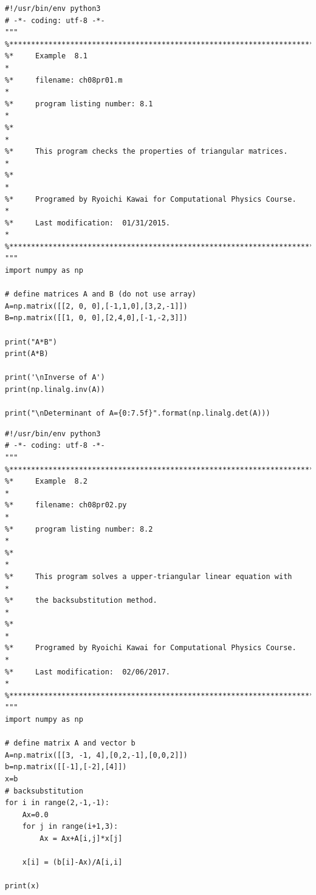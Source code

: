 \bigskip
\noindent
\program
\footnotesize
\begin{verbatim}
#!/usr/bin/env python3
# -*- coding: utf-8 -*-
"""
%**************************************************************************
%*     Example  8.1                                                       *
%*     filename: ch08pr01.m                                               *
%*     program listing number: 8.1                                        *
%*                                                                        *
%*     This program checks the properties of triangular matrices.         *
%*                                                                        *
%*     Programed by Ryoichi Kawai for Computational Physics Course.       *
%*     Last modification:  01/31/2015.                                    *
%**************************************************************************
"""
import numpy as np

# define matrices A and B (do not use array)
A=np.matrix([[2, 0, 0],[-1,1,0],[3,2,-1]])
B=np.matrix([[1, 0, 0],[2,4,0],[-1,-2,3]])

print("A*B")
print(A*B)

print('\nInverse of A')
print(np.linalg.inv(A))

print("\nDeterminant of A={0:7.5f}".format(np.linalg.det(A)))
\end{verbatim}


\bigskip
\noindent
\program
\footnotesize
\begin{verbatim}
#!/usr/bin/env python3
# -*- coding: utf-8 -*-
"""
%**************************************************************************
%*     Example  8.2                                                       *
%*     filename: ch08pr02.py                                              *
%*     program listing number: 8.2                                        *
%*                                                                        *
%*     This program solves a upper-triangular linear equation with        *
%*     the backsubstitution method.                                       *
%*                                                                        *
%*     Programed by Ryoichi Kawai for Computational Physics Course.       *
%*     Last modification:  02/06/2017.                                    *
%**************************************************************************
"""
import numpy as np

# define matrix A and vector b
A=np.matrix([[3, -1, 4],[0,2,-1],[0,0,2]])
b=np.matrix([[-1],[-2],[4]])
x=b
# backsubstitution
for i in range(2,-1,-1):
    Ax=0.0
    for j in range(i+1,3):
        Ax = Ax+A[i,j]*x[j]

    x[i] = (b[i]-Ax)/A[i,i]

print(x)
\end{verbatim}

